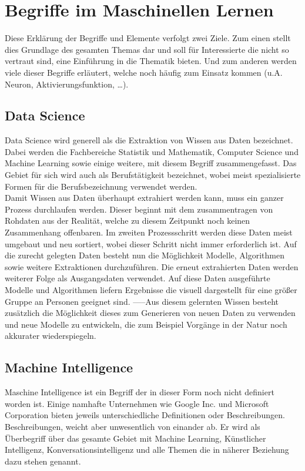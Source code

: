 \chapter{Begriffe im Maschinellen Lernen}
\label{cha:Begriffe}

Diese Erklärung der Begriffe und Elemente verfolgt zwei Ziele.
Zum einen stellt dies Grundlage des gesamten Themas dar und soll für Interessierte die nicht so vertraut sind, eine Einführung in die Thematik bieten. 
Und zum anderen werden viele dieser Begriffe erläutert, welche noch häufig zum Einsatz kommen (u.A. Neuron, Aktivierungsfunktion, …).

\section{Data Science}

Data Science wird generell als die Extraktion von Wissen aus Daten bezeichnet. 
Dabei werden die Fachbereiche Statistik und Mathematik, Computer Science und Machine Learning sowie einige weitere, mit diesem Begriff zusammengefasst. 
Das Gebiet für sich wird auch als Berufstätigkeit bezeichnet, wobei meist spezialisierte Formen für die Berufsbezeichnung verwendet werden.\\

Damit Wissen aus Daten überhaupt extrahiert werden kann, muss ein ganzer Prozess durchlaufen werden. 
Dieser beginnt mit dem zusammentragen von Rohdaten aus der Realität, welche zu diesem Zeitpunkt noch keinen Zusammenhang offenbaren. 
Im zweiten Prozessschritt werden diese Daten meist umgebaut und neu sortiert, wobei dieser Schritt nicht immer erforderlich ist. 
Auf die zurecht gelegten Daten besteht nun die Möglichkeit Modelle, Algorithmen sowie weitere Extraktionen durchzuführen. 
Die erneut extrahierten Daten werden weiterer Folge als Ausgangsdaten verwendet. 
Auf diese Daten ausgeführte Modelle und Algorithmen liefern Ergebnisse die visuell dargestellt für eine größer Gruppe an Personen geeignet sind. 
-----Aus diesem gelernten Wissen besteht zusätzlich die Möglichkeit dieses zum Generieren von neuen Daten zu verwenden und neue Modelle zu entwickeln, die zum Beispiel Vorgänge in der Natur noch akkurater wiederspiegeln.

\section{Machine Intelligence}

Maschine Intelligence ist ein Begriff der in dieser Form noch nicht definiert worden ist. 
Einige namhafte Unternehmen wie Google Inc. und Microsoft Corporation bieten jeweils unterschiedliche Definitionen oder Beschreibungen. 
Beschreibungen, weicht aber unwesentlich von einander ab.
Er wird als Überbegriff über das gesamte Gebiet mit Machine Learning, Künstlicher Intelligenz, Konversationsintelligenz und alle Themen die in näherer Beziehung dazu stehen genannt. 

